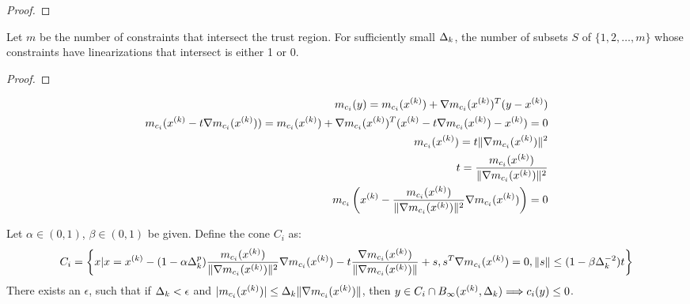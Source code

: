 \begin{proof}

\end{proof}



\begin{theorem}
Let $m$ be the number of constraints that intersect the trust region.
For sufficiently small $\Delta_k$, the number of subsets $S$ of $\{1, 2, \ldots, m\}$
whose constraints have linearizations that intersect is either 1 or 0.
\end{theorem}

\begin{proof}
\end{proof}



\begin{align*}
m_{c_i}(y) = m_{c_i}({x^{(k)}}) + \nabla m_{c_i}({x^{(k)}})^T(y - {x^{(k)}}) \\
m_{c_i}({x^{(k)}} - t \nabla m_{c_i}({x^{(k)}})) = m_{c_i}({x^{(k)}}) + \nabla m_{c_i}({x^{(k)}})^T({x^{(k)}} - t \nabla m_{c_i}({x^{(k)}}) - {x^{(k)}}) = 0 \\
m_{c_i}({x^{(k)}}) = t\|\nabla m_{c_i}({x^{(k)}})\|^2 \\
t = \frac {m_{c_i}({x^{(k)}})}{\|\nabla m_{c_i}({x^{(k)}})\|^2} \\
m_{c_i}\left({x^{(k)}} - \frac {m_{c_i}({x^{(k)}})}{\|\nabla m_{c_i}({x^{(k)}})\|^2} \nabla m_{c_i}({x^{(k)}})\right) = 0
\end{align*}

\begin{theorem}
Let $\alpha \in (0, 1)$, $\beta \in (0, 1)$ be given.
Define the cone $C_i$ as:
\begin{align*}
C_i = \left\{x | x = {x^{(k)}} - (1 - \alpha\Delta_k^p)\frac {m_{c_i}({x^{(k)}})}{\|\nabla m_{c_i}({x^{(k)}})\|^2} \nabla m_{c_i}({x^{(k)}}) - t\frac{\nabla m_{c_i}({x^{(k)}})}{\|\nabla m_{c_i}({x^{(k)}})\|} + s,s^T\nabla m_{c_i}({x^{(k)}})=0, \|s\| \le (1 - \beta\Delta_k^{-2})t \right\}
\end{align*}
There exists an $\epsilon$, such that if $\Delta_k < \epsilon$ and $|m_{c_i}({x^{(k)}})| \le \Delta_k\|\nabla m_{c_i}({x^{(k)}})\|$,
then $y \in C_i \cap B_{\infty}({x^{(k)}}, \Delta_k) \Longrightarrow c_i(y) \le 0$.
\end{theorem}

